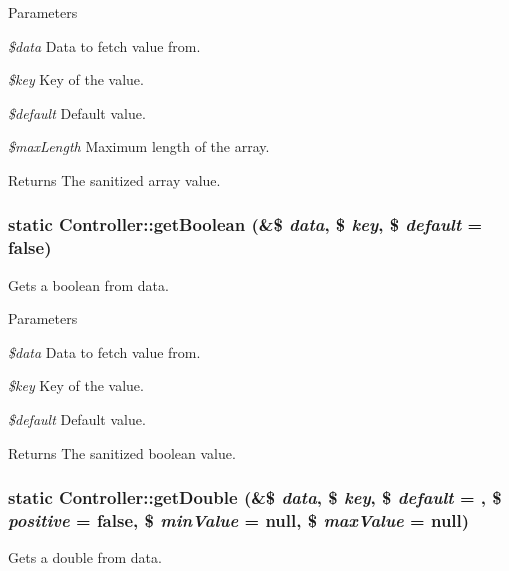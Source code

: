 \begin{DoxyParams}{Parameters}
\item[{\em \$data}]Data to fetch value from. \item[{\em \$key}]Key of the value. \item[{\em \$default}]Default value. \item[{\em \$maxLength}]Maximum length of the array.\end{DoxyParams}
\begin{DoxyReturn}{Returns}
The sanitized array value. 
\end{DoxyReturn}
\hypertarget{classController_aecd39da8a4e4e01b423691e681056fd1}{
\subsubsection[{getBoolean}]{\setlength{\rightskip}{0pt plus 5cm}static Controller::getBoolean (\&\$ {\em data}, \/  \$ {\em key}, \/  \$ {\em default} = {\ttfamily false})}}
\label{classController_aecd39da8a4e4e01b423691e681056fd1}
Gets a boolean from data.


\begin{DoxyParams}{Parameters}
\item[{\em \$data}]Data to fetch value from. \item[{\em \$key}]Key of the value. \item[{\em \$default}]Default value.\end{DoxyParams}
\begin{DoxyReturn}{Returns}
The sanitized boolean value. 
\end{DoxyReturn}
\hypertarget{classController_a948395589a3d40710b24dd5e48cfe65c}{
\subsubsection[{getDouble}]{\setlength{\rightskip}{0pt plus 5cm}static Controller::getDouble (\&\$ {\em data}, \/  \$ {\em key}, \/  \$ {\em default} = {}, \/  \$ {\em positive} = {\ttfamily false}, \/  \$ {\em minValue} = {\ttfamily null}, \/  \$ {\em maxValue} = {\ttfamily null})}}
\label{classController_a948395589a3d40710b24dd5e48cfe65c}
Gets a double from data.



